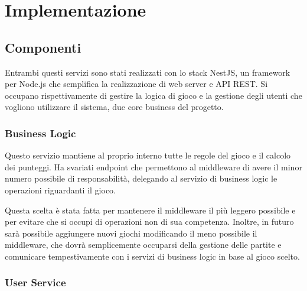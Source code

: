\chapter{Implementazione}
\label{ch:implementazione} %

\section{Componenti}


Entrambi questi servizi sono stati realizzati con lo stack NestJS, un framework per Node.js che semplifica la realizzazione di web server e API REST.
Si occupano rispettivamente di gestire la logica di gioco e la gestione degli utenti che vogliono utilizzare il sistema, due core business del progetto.

\subsection{Business Logic}

Questo servizio mantiene al proprio interno tutte le regole del gioco e il calcolo dei punteggi. 
Ha svariati endpoint che permettono al middleware di avere il minor numero possibile di responsabilità, delegando al servizio di business logic le operazioni riguardanti il gioco.

Questa scelta è stata fatta per mantenere il middleware il più leggero possibile e per evitare che si occupi di operazioni non di sua competenza. Inoltre, in futuro sarà possibile aggiungere nuovi giochi modificando il meno possibile il middleware, che dovrà semplicemente occuparsi della gestione delle partite e comunicare tempestivamente con i servizi di business logic in base al gioco scelto.

\subsection{User Service}

